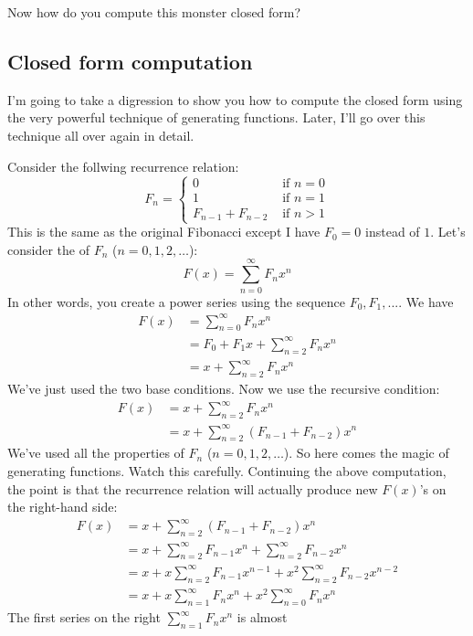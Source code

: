 Now how do you compute this monster closed form?

\subsection{Closed form computation}

I'm going to take a digression to show you how to compute
the closed form using the very powerful technique of generating functions.
Later, I'll go over this technique all over again in detail.

Consider the follwing recurrence relation:
\[ F_n = 
\begin{cases}
0 &\text{ if } n = 0 \\
1 &\text{ if } n = 1 \\
F_{n-1} + F_{n-2}  &\text{ if } n > 1 
\end{cases}
\]
This is the same as the original Fibonacci except I have $F_0 = 0$ instead of
$1$.
Let's consider the  of $F_n$ ($n=0, 1, 2, \ldots$):
\[
F(x) = \sum_{n=0}^\infty F_n x^n
\]
In other words, you create a power series using the sequence $F_0, F_1, ...$.
We have
\begin{align*}
F(x) 
&= \sum_{n=0}^\infty F_n x^n  \\
&= F_0 + F_1x + \sum_{n=2}^\infty F_n x^n \\
&= x + \sum_{n=2}^\infty F_n x^n
\end{align*}
We've just used the two base conditions.
Now we use the recursive condition:
\begin{align*}
F(x) 
&= x + \sum_{n=2}^\infty F_n x^n \\
&= x + \sum_{n=2}^\infty (F_{n-1} + F_{n-2}) x^n
\end{align*}
We've used all the properties of $F_n$ ($n=0, 1, 2, \ldots$).
So here comes the magic of generating functions.
Watch this carefully.
Continuing the above computation, the point is that the recurrence relation
will actually produce new $F(x)$'s on the right-hand side:
\begin{align*}
F(x) 
&= x + \sum_{n=2}^\infty (F_{n-1} + F_{n-2}) x^n \\
&= x + \sum_{n=2}^\infty F_{n-1} x^n + \sum_{n=2}^\infty F_{n-2} x^n \\
&= x + x\sum_{n=2}^\infty F_{n-1} x^{n-1} + x^2\sum_{n=2}^\infty F_{n-2} x^{n-2} \\
&= x + x\sum_{n=1}^\infty F_n x^n + x^2\sum_{n=0}^\infty F_n x^n
\end{align*}
The first series on the right $\sum_{n=1}^\infty F_n x^n$ is almost
